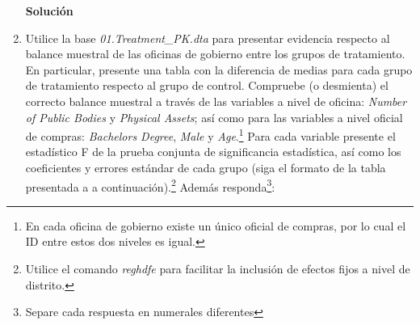 \documentclass[a4paper, answers, addpoints, 11pt]{exam}
\newenvironment{solucion}{%
  \begin{mdframed}[
    backgroundcolor=blue!5,    %
    linecolor=blue!50,          %
    linewidth=2pt,              %
    leftmargin=10pt,            %
    rightmargin=10pt,           %
    topline=true,              %
    bottomline=true,            %
    roundcorner=10pt,           %
    innerleftmargin=10pt,       %
    innerrightmargin=10pt,      %
    innerbottommargin=10pt,     %
    innertopmargin=10pt         %
  ]%
  \begin{tcolorbox}[colframe=blue!50!black, colback=blue!50, coltitle=white, sharp corners=all, boxrule=1mm, width=\textwidth, halign=left, valign=center, top=0mm, bottom=0mm, left=0mm, right=0mm] \textbf{Solución} \end{tcolorbox} }{\end{mdframed}}
\begin{document}
\begin{enumerate}
\begin{solucion}
\end{solucion}

    
    \item Utilice la base \textit{01.Treatment\_PK.dta} para presentar evidencia respecto al balance muestral de las oficinas de gobierno entre los grupos de tratamiento. En particular, presente una tabla con la diferencia de medias para cada grupo de tratamiento respecto al grupo de control. Compruebe (o desmienta) el correcto balance muestral a través de las variables a nivel de oficina: \textit{Number of Public Bodies} y \textit{Physical Assets}; así como para las variables a nivel oficial de compras: \textit{Bachelors Degree}, \textit{Male} y \textit{Age}.\footnote{\footnotesize{En cada oficina de gobierno existe un único oficial de compras, por lo cual el ID entre estos dos niveles es igual.}} Para cada variable presente el estadístico F de la prueba conjunta de significancia estadística, así como los coeficientes y errores estándar de cada grupo (siga el formato de la tabla presentada a a continuación).\footnote{\footnotesize{Utilice el comando \textit{reghdfe} para facilitar la inclusión de efectos fijos a nivel de distrito.}} Además responda\footnote{\footnotesize{Separe cada respuesta en numerales diferentes}}:


\end{enumerate}
\end{document}
